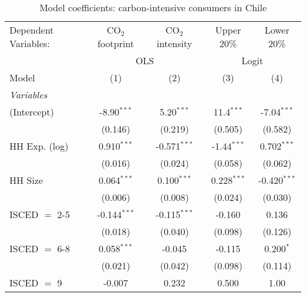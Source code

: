 
\begin{table}[htbp!]
   \centering
   \small
   \begin{adjustbox}{width = 1\textwidth, max height = 0.95\textheight, center}
      \begin{threeparttable}[b]
         \caption{\label{tab:Logit_1_CHL} Model coefficients: carbon-intensive consumers in Chile}
         \begin{tabular}{lcccc}
            \tabularnewline \midrule \midrule
            Dependent Variables: & CO$_{2}$ footprint & CO$_{2}$ intensity & Upper 20\%    & Lower 20\%\\   
             & \multicolumn{2}{c}{OLS} & \multicolumn{2}{c}{Logit} \\ 
            Model                & (1)                & (2)                & (3)           & (4)\\  
            \midrule
            \emph{Variables}\\
            (Intercept)          & -8.90$^{***}$      & 5.20$^{***}$       & 11.4$^{***}$  & -7.04$^{***}$\\   
                                 & (0.146)            & (0.219)            & (0.505)       & (0.582)\\   
            HH Exp. (log)        & 0.910$^{***}$      & -0.571$^{***}$     & -1.44$^{***}$ & 0.702$^{***}$\\   
                                 & (0.016)            & (0.024)            & (0.058)       & (0.062)\\   
            HH Size              & 0.064$^{***}$      & 0.100$^{***}$      & 0.228$^{***}$ & -0.420$^{***}$\\   
                                 & (0.006)            & (0.008)            & (0.024)       & (0.030)\\   
            ISCED $=$ 2-5        & -0.144$^{***}$     & -0.115$^{***}$     & -0.160        & 0.136\\   
                                 & (0.018)            & (0.040)            & (0.098)       & (0.126)\\   
            ISCED $=$ 6-8        & 0.058$^{***}$      & -0.045             & -0.115        & 0.200$^{*}$\\   
                                 & (0.021)            & (0.042)            & (0.098)       & (0.114)\\   
            ISCED $=$ 9          & -0.007             & 0.232              & 0.500         & 1.00\\   

\end{tabular}
\end{threeparttable}
\end{adjustbox}
\end{table}
